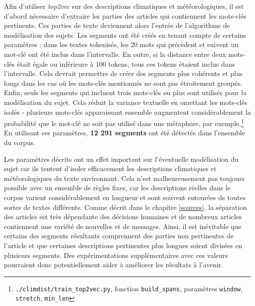 \documentclass[a4paper,twoside,12pt]{article}
\begin{document}
Afin d'utiliser \textit{top2vec} sur des descriptions climatiques et météorologiques, il est d'abord nécessaire d'extraire les parties des articles qui contiennent les mots-clés pertinents. Ces parties de texte deviennent alors l'entrée de l'algorithme de modélisation des sujets. Les segments ont été créés en tenant compte de certains paramètres : dans les textes tokenisés, les 20 mots qui précèdent et suivent un mot-clé ont été inclus dans l'intervalle. En outre, si la distance entre deux mots-clés était égale ou inférieure à 100 tokens, tous ces tokens étaient inclus dans l'intervalle. Cela devrait permettre de créer des segments plus cohérents et plus longs dans les cas où les mots-clés mentionnés ne sont pas étroitement groupés. Enfin, seuls les segments qui incluent trois mots-clés ou plus sont utilisés pour la modélisation du sujet. Cela réduit la variance textuelle en omettant les mots-clés isolés - plusieurs mots-clés apparaissant ensemble augmentent considérablement la probabilité que le mot-clé ne soit pas utilisé dans une métaphore, par exemple.\footnote{\texttt{./climdist/train\_top2vec.py}, fonction \texttt{build\_spans}, paramètres \texttt{window}, \texttt{stretch}, \texttt{min\_len}} En utilisant ces paramètres, \textbf{12 291 segments} ont été détectés dans l'ensemble du corpus.

Les paramètres décrits ont un effet important sur l'éventuelle modélisation du sujet car ils tentent d'isoler efficacement les descriptions climatiques et météorologiques du texte environnant. Cela n'est malheureusement pas toujours possible avec un ensemble de règles fixes, car les descriptions réelles dans le corpus varient considérablement en longueur et sont souvent entourées de toutes sortes de textes différents. Comme décrit dans le chapitre \ref{sources}, la séparation des articles est très dépendante des décisions humaines et de nombreux articles contiennent une variété de nouvelles et de messages. Ainsi, il est inévitable que certains des segments résultants comprennent des parties non pertinentes de l'article et que certaines descriptions pertinentes plus longues soient divisées en plusieurs segments. Des expérimentations supplémentaires avec ces valeurs pourraient donc potentiellement aider à améliorer les résultats à l'avenir.
\end{document}
